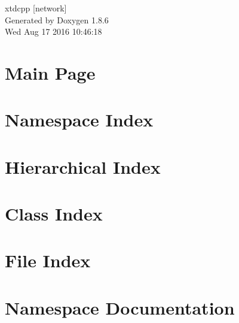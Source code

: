 \documentclass[twoside]{book}
\newcommand{\clearemptydoublepage}{%
  \newpage{\pagestyle{empty}\cleardoublepage}%
}
\begin{document}
\hypersetup{pageanchor=false}
\begin{titlepage}
\vspace*{7cm}
\begin{center}%
{\Large xtdcpp \mbox{[}network\mbox{]} }\\
\vspace*{1cm}
{\large Generated by Doxygen 1.8.6}\\
\vspace*{0.5cm}
{\small Wed Aug 17 2016 10:46:18}\\
\end{center}
\end{titlepage}
\clearemptydoublepage
\tableofcontents
\clearemptydoublepage
{}
\hypersetup{pageanchor=true}

\chapter{Main Page}
\label{index}\hypertarget{index}{}
\chapter{Namespace Index}

\chapter{Hierarchical Index}

\chapter{Class Index}

\chapter{File Index}

\chapter{Namespace Documentation}








\end{document}
